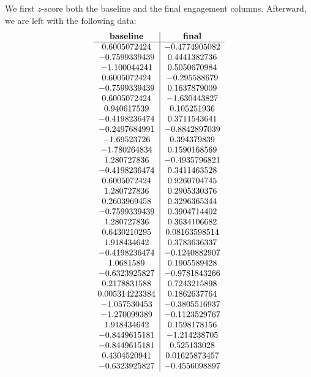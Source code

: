 \documentclass[12pt]{article}
\begin{document}
We first $z$-score both the baseline and the final engagement columns. Afterward, we are left with the following data:
\[
\begin{array}{c|c}
\text{\textbf{baseline}} & \text{\textbf{final}} \\
\hline
0.6005072424 & -0.4774905082 \\
-0.7599339439 & 0.4441382736 \\
-1.100044241 & 0.5050670984 \\
0.6005072424 & -0.295588679 \\
-0.7599339439 & 0.1637879009 \\
0.6005072424 & -1.630443827 \\
0.940617539 & 0.105251936 \\
-0.4198236474 & 0.3711543641 \\
-0.2497684991 & -0.8842897039 \\
-1.69523726 & 0.394379839 \\
-1.780264834 & 0.1590168569 \\
1.280727836 & -0.4935796821 \\
-0.4198236474 & 0.3411463528 \\
0.6005072424 & 0.9260704745 \\
1.280727836 & 0.2905330376 \\
0.2603969458 & 0.3296365344 \\
-0.7599339439 & 0.3904714402 \\
1.280727836 & 0.3634106682 \\
0.6430210295 & 0.08163598514 \\
1.918434642 & 0.3783636337 \\
-0.4198236474 & -0.1240882907 \\
1.0681589 & 0.1905589428 \\
-0.6323925827 & -0.9781843266 \\
0.2178831588 & 0.7243215898 \\
0.005314223384 & 0.1862637764 \\
-1.057530453 & -0.3805516937 \\
-1.270099389 & -0.1123529767 \\
1.918434642 & 0.1598178156 \\
-0.8449615181 & -1.214238705 \\
-0.8449615181 & 0.525133028 \\
0.4304520941 & 0.01625873457 \\
-0.6323925827 & -0.4556098897 \\
\end{array}
\]
\end{document}
